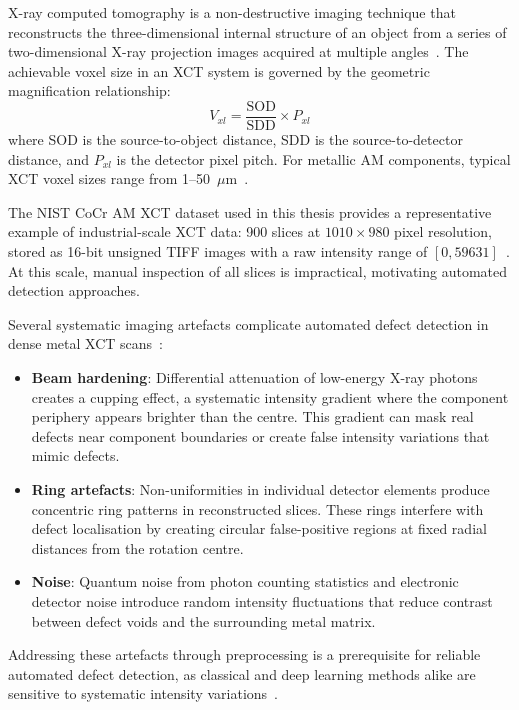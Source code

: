 X-ray computed tomography is a non-destructive imaging technique that reconstructs the
three-dimensional internal structure of an object from a series of two-dimensional X-ray projection
images acquired at multiple angles~\citep{Miller2020}. The achievable voxel size in an XCT system is
governed by the geometric magnification relationship:
\begin{equation}
V_{xl} = \frac{\mathrm{SOD}}{\mathrm{SDD}} \times P_{xl}
\label{eq:voxel_size}
\end{equation}
where SOD is the source-to-object distance, SDD is the source-to-detector distance, and $P_{xl}$ is
the detector pixel pitch. For metallic AM components, typical XCT voxel sizes range from
1--50~$\mu$m~\citep{Miller2020}.

The NIST CoCr AM XCT dataset used in this thesis provides a representative example of
industrial-scale XCT data: 900 slices at $1010 \times 980$ pixel resolution, stored as 16-bit
unsigned TIFF images with a raw intensity range of $[0, 59631]$~\citep{NIST_CoCr}. At this scale,
manual inspection of all slices is impractical, motivating automated detection approaches.

Several systematic imaging artefacts complicate automated defect detection in dense metal XCT
scans~\citep{Miller2020}:
\begin{itemize}
\item \textbf{Beam hardening}: Differential attenuation of low-energy X-ray photons creates a
  cupping effect, a systematic intensity gradient where the component periphery appears brighter
  than the centre. This gradient can mask real defects near component boundaries or create false
  intensity variations that mimic defects.
\item \textbf{Ring artefacts}: Non-uniformities in individual detector elements produce concentric
  ring patterns in reconstructed slices. These rings interfere with defect localisation by creating
  circular false-positive regions at fixed radial distances from the rotation centre.
\item \textbf{Noise}: Quantum noise from photon counting statistics and electronic detector noise
  introduce random intensity fluctuations that reduce contrast between defect voids and the
  surrounding metal matrix.
\end{itemize}
Addressing these artefacts through preprocessing is a prerequisite for reliable automated defect
detection, as classical and deep learning methods alike are sensitive to systematic intensity
variations~\citep{Bellens2021}.

